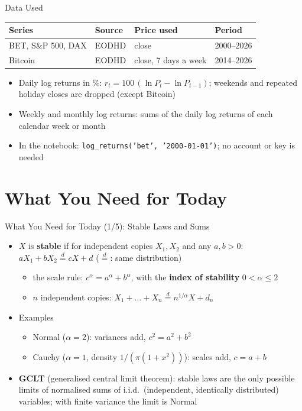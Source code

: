 \begin{frame}{Data Used}
\itemsize{\small}
\begin{center}
\footnotesize
\begin{tabular}{llll}
\toprule
\textbf{Series} & \textbf{Source} & \textbf{Price used} & \textbf{Period} \\
\midrule
BET, S\&P 500, DAX & EODHD & close & 2000--2026 \\
Bitcoin & EODHD & close, 7 days a week & 2014--2026 \\
\bottomrule
\end{tabular}
\end{center}
\begin{itemize}
    \item Daily log returns in \%: $r_t = 100\,(\ln P_t - \ln P_{t-1})$; weekends and repeated holiday closes are dropped (except Bitcoin)
    \item Weekly and monthly log returns: sums of the daily log returns of each calendar week or month
    \item In the notebook: \texttt{log\_returns('bet', '2000-01-01')}; no account or key is needed
\end{itemize}
\end{frame}


\section{What You Need for Today}

\begin{frame}{What You Need for Today (1/5): Stable Laws and Sums}
\itemsize{\small}
\begin{itemize}
    \item $X$ is \textbf{stable} if for independent copies $X_1, X_2$ and any $a, b > 0$: $aX_1 + bX_2 \overset{d}{=} cX + d$ ($\overset{d}{=}$: same distribution)
    \begin{itemize}
        \item the scale rule: $c^\alpha = a^\alpha + b^\alpha$, with the \textbf{index of stability} $0 < \alpha \le 2$
        \item $n$ independent copies: $X_1 + \dots + X_n \overset{d}{=} n^{1/\alpha}X + d_n$
    \end{itemize}
    \item Examples
    \begin{itemize}
        \item Normal ($\alpha = 2$): variances add, $c^2 = a^2 + b^2$
        \item Cauchy ($\alpha = 1$, density $1/(\pi(1 + x^2))$): scales add, $c = a + b$
    \end{itemize}
    \item \textbf{GCLT} (generalised central limit theorem): stable laws are the only possible limits of normalised sums of i.i.d.\ (independent, identically distributed) variables; with finite variance the limit is Normal
\end{itemize}
\end{frame}

